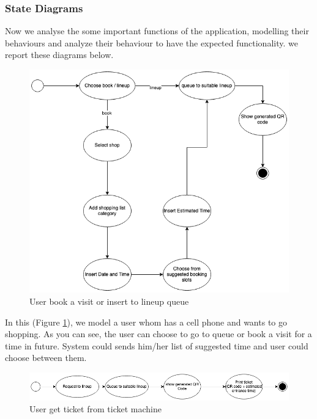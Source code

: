 \subsubsection{State Diagrams}
Now we analyse the some important functions of the application, modelling their behaviours and analyze their behaviour to have the expected functionality. we report these diagrams below. \\

\begin{figure}[H]
  \includegraphics[width=\textwidth,height=\textheight,keepaspectratio]{images/bookLineup.png}
  \caption{User book a visit or insert to lineup queue}
  \label{fig:bookLineup}
\end{figure}

In this (Figure \ref{fig:bookLineup}), we model a user whom has a cell phone and wants to go shopping. As you can see, the user can choose to go to queue or book a visit for a time in future. System could sends him/her list of suggested time and user could choose between them.

\begin{figure}[H]
  \includegraphics[width=\textwidth,height=\textheight,keepaspectratio]{images/OfflineTicket.png}
  \caption{User get ticket from ticket machine}
  \label{fig:OfflineTicket}
\end{figure}

